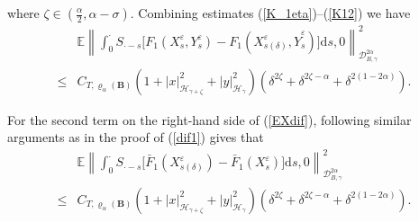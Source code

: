 \documentclass[10pt,a4paper]{article}
\numberwithin{equation}{section}
\begin{document}
where $\zeta \in (\frac \alpha2, \alpha-\sigma)$. Combining estimates (\ref{K_1eta})--(\ref{K12}) we have
\begin{align}\label{dif1}
 &\mathbb E \left\| \displaystyle\int_0^\cdot S_{\cdot-s} \big[F_1(X_s^\varepsilon,Y_s^\varepsilon)
-F_1(X_{s(\delta)}^\varepsilon,\hat{Y}_s^\varepsilon) \big]\mathrm{d} s,0 \right\|_{\mathcal{D}_{B,\gamma}^{2\alpha}}^2  \nonumber\\
\leq & C_{T,\varrho_{\alpha}(\mathbf{B})} (1+|x|_{\mathcal{H}_{\gamma+\zeta}}^2+|y|_{\mathcal{H}_\gamma}^2) (\delta^{2\zeta}+\delta^{2\zeta-\alpha}+\delta^{2(1-2\alpha)}).
\end{align}





For the second term on the right-hand side of (\ref{EXdif}), following similar arguments as in the proof of (\ref{dif1}) gives that
\begin{align}\label{dif2}
&\mathbb E \left\| \displaystyle\int_0^\cdot S_{\cdot-s} \big[\bar{F}_1(X_{s(\delta)}^\varepsilon)
-\bar{F}_1(X_s^\varepsilon) \big]\mathrm{d} s,0 \right\|_{\mathcal{D}_{B,\gamma}^{2\alpha}}^2 \nonumber\\
\leq & C_{T,\varrho_{\alpha}(\mathbf{B})} (1+|x|_{\mathcal{H}_{\gamma+\zeta}}^2+|y|_{\mathcal{H}_\gamma}^2) (\delta^{2\zeta}+\delta^{2\zeta-\alpha}+\delta^{2(1-2\alpha)}).
\end{align}
\end{document}
